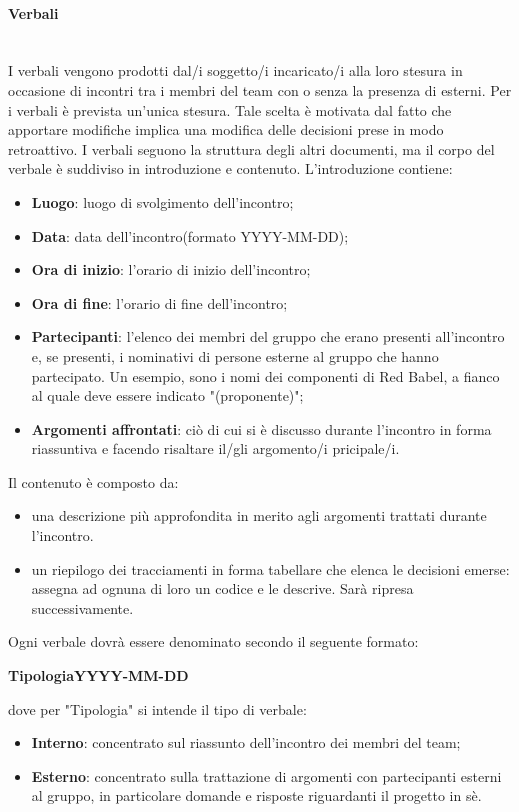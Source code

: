 		\paragraph{Verbali} \mbox{}\\
		I verbali vengono prodotti dal/i soggetto/i incaricato/i alla loro stesura in occasione di incontri tra i membri del team con o senza la presenza di esterni. Per i verbali è prevista un’unica stesura. Tale	scelta è motivata dal fatto che apportare modifiche implica una modifica delle decisioni prese in modo retroattivo.
		I verbali seguono la struttura degli altri documenti, ma il corpo del verbale è suddiviso in introduzione e contenuto.
		L'introduzione contiene:
		\begin{itemize}
			\item \textbf{Luogo}: luogo di svolgimento dell'incontro;
			\item \textbf{Data}: data dell'incontro(formato YYYY-MM-DD);
			\item \textbf{Ora di inizio}: l'orario di inizio dell'incontro;
			\item \textbf{Ora di fine}: l'orario di fine dell'incontro;
			\item \textbf{Partecipanti}: l'elenco dei membri del gruppo che erano presenti all'incontro e, se presenti, i nominativi di persone esterne al gruppo che hanno partecipato. Un esempio, sono i nomi dei componenti di Red Babel, a fianco al quale deve essere indicato "(proponente)";
			\item \textbf{Argomenti affrontati}: ciò di cui si è discusso durante l'incontro in forma riassuntiva e facendo risaltare il/gli argomento/i pricipale/i.
		\end{itemize}
	Il contenuto è composto da:
	\begin{itemize}
		\item una descrizione più approfondita in merito agli argomenti trattati durante l'incontro.
		\item un riepilogo dei tracciamenti in forma tabellare che elenca le decisioni emerse: assegna ad ognuna di loro un codice e le descrive. Sarà ripresa successivamente.
	\end{itemize}
		Ogni verbale dovrà essere denominato secondo il seguente formato: \newline
		\centerline{\textbf{TipologiaYYYY-MM-DD}} \newline \newline
		dove per "Tipologia" si intende il tipo di verbale:
		\begin{itemize}
			\item \textbf{Interno}: concentrato sul riassunto dell'incontro dei membri del team;
			\item \textbf{Esterno}: concentrato sulla trattazione di argomenti con partecipanti esterni al gruppo, in particolare domande e risposte riguardanti il progetto in sè.
		\end{itemize}
